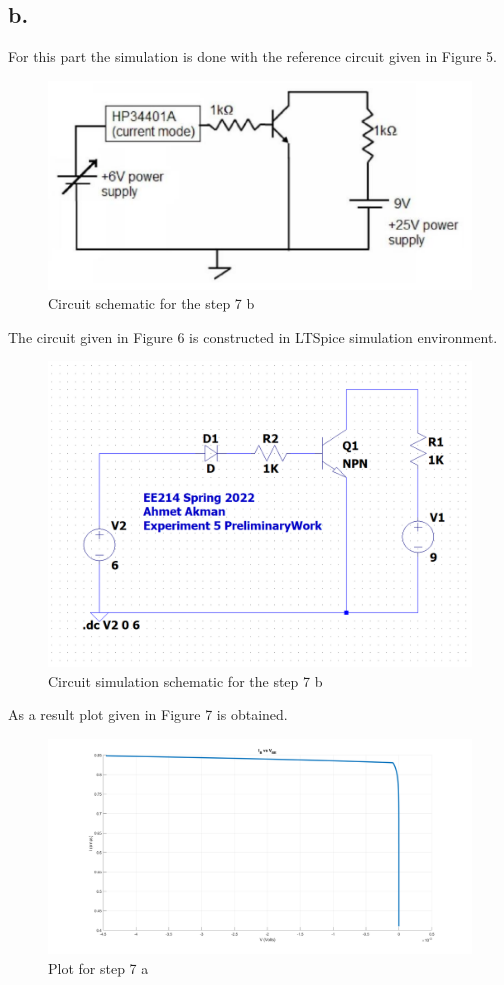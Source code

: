 \documentclass[letterpaper,12pt]{article}
\begin{document}
\subsection{b.}
For this part the simulation is done with the reference circuit given in Figure 5.
\begin{figure}[H]
    \centering
    \includegraphics[width=1\textwidth]{fig5.png}
    \caption{Circuit schematic for the step 7 b}
    \end{figure} 
    The circuit given in Figure 6 is constructed in LTSpice simulation environment.
\begin{figure}[H]
\centering
\includegraphics[width=1\textwidth]{5sim.png}
\caption{Circuit simulation schematic for the step 7 b}
\end{figure} 
As a result plot given in Figure 7 is obtained.
\begin{figure}[H]
    \centering
    \includegraphics[width=1\textwidth]{7_2.png}
\caption{Plot for step 7 a}
\end{figure} 
\end{document}
